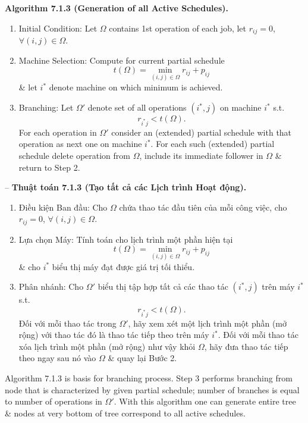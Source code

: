 \documentclass{article}
\begin{document}
\begin{itemize}
\begin{itemize}
        {\bf Algorithm 7.1.3 (Generation of all Active Schedules).}
        \begin{enumerate}
            \item Initial Condition: Let $\Omega$ contains 1st operation of each job, let $r_{ij} = 0$, $\forall(i,j)\in\Omega$.
            \item Machine Selection: Compute for current partial schedule
            \begin{equation*}
                t(\Omega) = \min_{(i,j)\in\Omega} r_{ij} + p_{ij}
            \end{equation*}
            \& let $i^*$ denote machine on which minimum is achieved.
            \item Branching: Let $\Omega'$ denote set of all operations $(i^*,j)$ on machine $i^*$ s.t.
            \begin{equation*}
                r_{i^*j} < t(\Omega).
            \end{equation*}
            For each operation in $\Omega'$ consider an (extended) partial schedule with that operation as next one on machine $i^*$. For each such (extended) partial schedule delete operation from $\Omega$, include its immediate follower in $\Omega$ \& return to Step 2.
        \end{enumerate}
        -- {\bf Thuật toán 7.1.3 (Tạo tất cả các Lịch trình Hoạt động).}
        \begin{enumerate}
            \item Điều kiện Ban đầu: Cho $\Omega$ chứa thao tác đầu tiên của mỗi công việc, cho $r_{ij} = 0$, $\forall(i,j)\in\Omega$.
            \item Lựa chọn Máy: Tính toán cho lịch trình một phần hiện tại
            \begin{equation*}
                t(\Omega) = \min_{(i,j)\in\Omega} r_{ij} + p_{ij}
            \end{equation*}
            \& cho $i^*$ biểu thị máy đạt được giá trị tối thiểu.
            \item Phân nhánh: Cho $\Omega'$ biểu thị tập hợp tất cả các thao tác $(i^*,j)$ trên máy $i^*$ s.t.
            \begin{equation*}
                r_{i^*j} < t(\Omega).
            \end{equation*}
            Đối với mỗi thao tác trong $\Omega'$, hãy xem xét một lịch trình một phần (mở rộng) với thao tác đó là thao tác tiếp theo trên máy $i^*$. Đối với mỗi thao tác xóa lịch trình một phần (mở rộng) như vậy khỏi $\Omega$, hãy đưa thao tác tiếp theo ngay sau nó vào $\Omega$ \& quay lại Bước 2.
        \end{enumerate}
        Algorithm 7.1.3 is basis for branching process. Step 3 performs branching from node that is characterized by given partial schedule; number of branches is equal to number of operations in $\Omega'$. With this algorithm one can generate entire tree \& nodes at very bottom of tree correspond to all active schedules.


\end{itemize}
\end{itemize}
\end{document}
